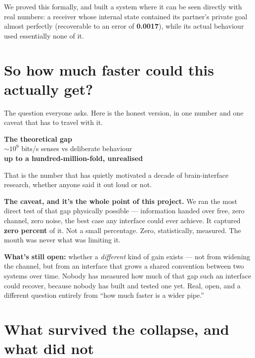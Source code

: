 \documentclass[11pt]{article}
\begin{document}
We proved this formally, and built a system where it can be seen directly with real numbers: a receiver whose internal state contained its partner's private goal almost perfectly (recoverable to an error of \textbf{0.0017}), while its actual behaviour used essentially none of it.

\section{So how much faster could this actually get?}

The question everyone asks. Here is the honest version, in one number and one caveat that has to travel with it.

\begin{statbox}
\centering
\textbf{The theoretical gap}\\[4pt]
{\Large $\sim 10^9$ bits/s} \quad senses \qquad vs  \quad deliberate behaviour\\[6pt]
{\large\bfseries up to a hundred-million-fold, unrealised}
\end{statbox}

\vspace{0.3cm}
That is the number that has quietly motivated a decade of brain-interface research, whether anyone said it out loud or not.

\begin{pullquote}
\textbf{The caveat, and it's the whole point of this project.} We ran the most direct test of that gap physically possible --- information handed over free, zero channel, zero noise, the best case any interface could ever achieve. It captured \textbf{zero percent} of it. Not a small percentage. Zero, statistically, measured. The mouth was never what was limiting it.
\end{pullquote}

\textbf{What's still open:} whether a \emph{different} kind of gain exists --- not from widening the channel, but from an interface that grows a shared convention between two systems over time. Nobody has measured how much of that gap such an interface could recover, because nobody has built and tested one yet. Real, open, and a different question entirely from ``how much faster is a wider pipe.''

\section{What survived the collapse, and what did not}
\end{document}

